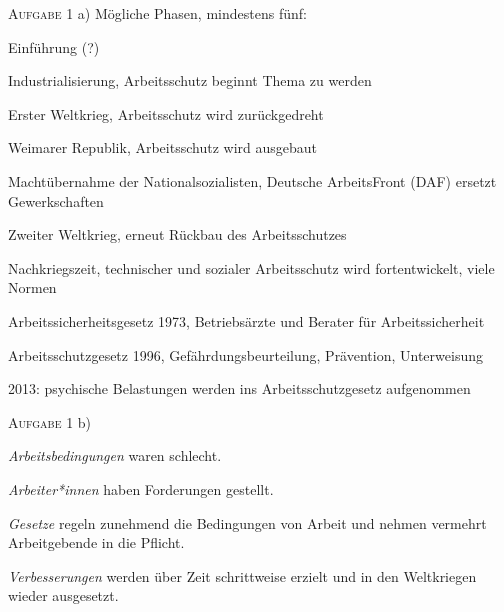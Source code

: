 \textsc{Aufgabe 1} a) \quad Mögliche Phasen, mindestens fünf: 
\begin{myenumerate}
    \item Einführung (?)
    \item Industrialisierung, Arbeitsschutz beginnt Thema zu werden %

    \item Erster Weltkrieg, Arbeitsschutz wird zurückgedreht
    \item Weimarer Republik, Arbeitsschutz wird ausgebaut
    \item Machtübernahme der Nationalsozialisten, Deutsche ArbeitsFront (DAF) ersetzt Gewerkschaften
    \item Zweiter Weltkrieg, erneut Rückbau des Arbeitsschutzes
    \item Nachkriegszeit, technischer und sozialer Arbeitsschutz wird fortentwickelt, viele Normen
    \item Arbeitssicherheitsgesetz 1973, Betriebsärzte und Berater für Arbeitssicherheit 
    \item Arbeitsschutzgesetz 1996, Gefährdungsbeurteilung, Prävention, Unterweisung
    \item 2013: psychische Belastungen werden ins Arbeitsschutzgesetz aufgenommen
\end{myenumerate}

\textsc{Aufgabe 1} b) \quad
\begin{myitemize}
    \item \emph{Arbeitsbedingungen} waren schlecht.
    \item \emph{Arbeiter*innen} haben Forderungen gestellt.
    \item \emph{Gesetze} regeln zunehmend die Bedingungen von Arbeit und nehmen vermehrt Arbeitgebende in die Pflicht. 
    \item \emph{Verbesserungen} werden über Zeit schrittweise erzielt und in den Weltkriegen wieder ausgesetzt. 
\end{myitemize}



